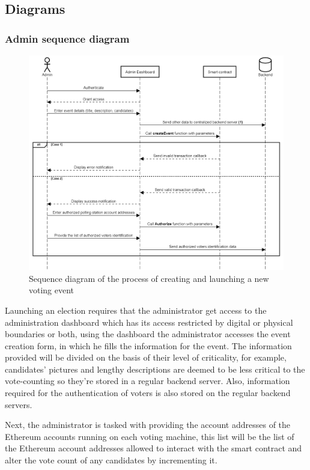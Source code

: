 \subsection{Diagrams}
\subsubsection{Admin sequence diagram}

\begin{figure}[H]
	\centering
		\includegraphics[width=14cm]{images/chapter3/admin_sequence_diagram.png}
		\caption{{\footnotesize Sequence diagram of the process of creating and launching a new voting event}}
\end{figure}

Launching an election requires that the administrator get access to the administration dashboard which has its access restricted by digital or physical boundaries or both, using the dashboard the administrator accesses the event creation form, in which he fills the information for the event. The information provided will be divided on the basis of their level of criticality, for example, candidates' pictures and lengthy descriptions are deemed to be less critical to the vote-counting so they're stored in a regular backend server. Also, information required for the authentication of voters is also stored on the regular backend servers.

Next, the administrator is tasked with providing the account addresses of the Ethereum accounts running on each voting machine, this list will be the list of the Ethereum account addresses allowed to interact with the smart contract and alter the vote count of any candidates by incrementing it.

